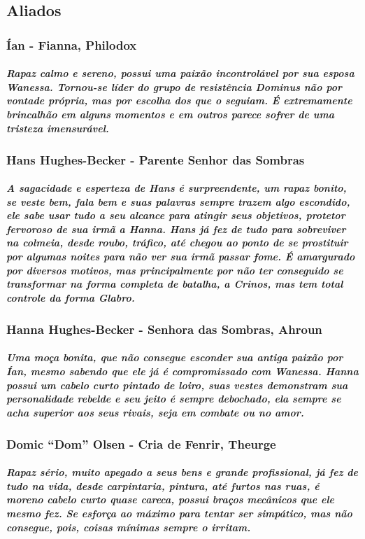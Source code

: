 \subsection{\bf Aliados}
\subsubsection{\bf Ían - Fianna, Philodox}
\subparagraph*{Rapaz calmo e sereno, possui uma paixão incontrolável por sua esposa Wanessa. Tornou-se líder do grupo de resistência Dominus não por vontade própria, mas por escolha dos que o seguiam. É extremamente brincalhão em alguns momentos e em outros parece sofrer de uma tristeza imensurável.}
\preencher

\subsubsection{\bf Hans Hughes-Becker - Parente Senhor das Sombras}
\subparagraph*{A sagacidade e esperteza de Hans é surpreendente, um rapaz bonito, se veste bem, fala bem e suas palavras sempre trazem algo escondido, ele sabe usar tudo a seu alcance para atingir seus objetivos, protetor fervoroso de sua irmã a Hanna. Hans já fez de tudo para sobreviver na colmeia, desde roubo, tráfico, até chegou ao ponto de se prostituir por algumas noites para não ver sua irmã passar fome. É amargurado por diversos motivos, mas principalmente por não ter conseguido se transformar na forma completa de batalha, a Crinos, mas tem total controle da forma Glabro.}
\preencher

\subsubsection{\bf Hanna Hughes-Becker - Senhora das Sombras, Ahroun}
\subparagraph*{Uma moça bonita, que não consegue esconder sua antiga paixão por Ían, mesmo sabendo que ele já é compromissado com Wanessa. Hanna possui um cabelo curto pintado de loiro, suas vestes demonstram sua personalidade rebelde e seu jeito é sempre debochado, ela sempre se acha superior aos seus rivais, seja em combate ou no amor.}
\preencher


\subsubsection{\bf Domic “Dom” Olsen - Cria de Fenrir, Theurge}
\subparagraph*{Rapaz sério, muito apegado a seus bens e grande profissional, já fez de tudo na vida, desde carpintaria, pintura, até furtos nas ruas, é moreno cabelo curto quase careca, possui braços mecânicos que ele mesmo fez. Se esforça ao máximo para tentar ser simpático, mas não consegue, pois, coisas mínimas sempre o irritam.}
\preencher

